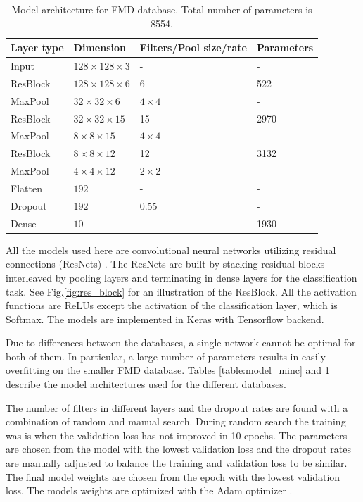 \documentclass[12pt,a4paper]{article}
\begin{document}
	\begin{table}[t!]
		\centering
		\caption{Model architecture for FMD database. Total number of parameters is 8554.}
		\begin{tabular}{l|l l l}
			Layer type  & Dimension & Filters/Pool size/rate & Parameters 	\\ \hline
			Input 		& $128 \times 128 \times 3$ & -  			& -     \\ \hline
			ResBlock 	& $128 \times 128 \times 6$ & 6 			& 522   \\ \hline
			MaxPool 	& $32 \times 32 \times 6$   & $4 \times 4$	& -     \\ \hline
			ResBlock 	& $32 \times 32 \times 15$  & 15 			& 2970  \\ \hline
			MaxPool 	& $8 \times 8 \times 15$    & $4 \times 4$ 	& -     \\ \hline
			ResBlock 	& $8 \times 8 \times 12$    & 12 			& 3132  \\ \hline
			MaxPool 	& $4 \times 4 \times 12$    & $2 \times 2$ 	& -     \\ \hline
			Flatten 	& $192$ 	 			    & -  			& -	    \\ \hline
			Dropout 	& $192$ 	 			    & 0.55  		& -	    \\ \hline
			Dense 		& $10$ 	 			   	    & -  			& 1930  \\ \hline
		\end{tabular}
		\label{table:model_fmd}
	\end{table}

	
	
	All the models used here are convolutional neural networks utilizing residual connections (ResNets) \cite{he_2015}. The ResNets are built by stacking residual blocks interleaved by pooling layers and terminating in dense layers for the classification task. See Fig.\ref{fig:res_block} for an illustration of the ResBlock. All the activation functions are ReLUs except the activation of the classification layer, which is Softmax. The models are implemented in Keras \cite{chollet_keras} with Tensorflow \cite{tensorflow} backend.
	
	Due to differences between the databases, a single network cannot be optimal for both of them. In particular, a large number of parameters results in easily overfitting on the smaller FMD database. Tables \ref{table:model_minc} and \ref{table:model_fmd} describe the model architectures used for the different databases. 
	
	The number of filters in different layers and the dropout rates are found with a combination of random and manual search. During random search the training was is when the validation loss has not improved in 10 epochs. The parameters are chosen from the model with the lowest validation loss and the dropout rates are manually adjusted to balance the training and validation loss to be similar. The final model weights are chosen from the epoch with the lowest validation loss. The models weights are optimized with the Adam optimizer \cite{kingma_2014}.
	
\end{document}
